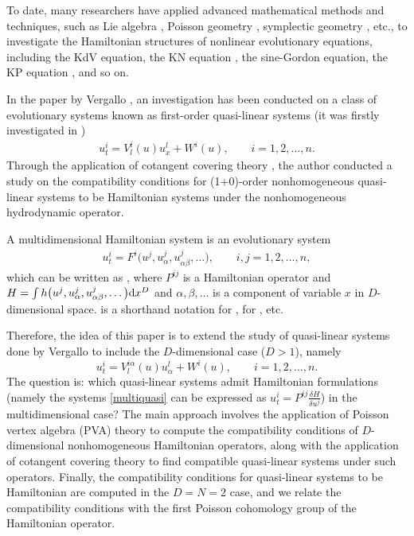 \documentclass[pdftex]{sigma}
\numberwithin{equation}{section}
\begin{document}
To date, many researchers have applied advanced mathematical methods and techniques, such as Lie algebra \cite{olver1993applications}, Poisson geometry \cite{weinstein1983local}, symplectic geometry \cite{mokhov1995symplectic}, etc., to investigate the Hamiltonian structures of nonlinear evolutionary equations, including the KdV equation, the KN equation \cite{mokhov1995symplectic}, the sine-Gordon equation, the KP equation \cite{dubrovin2001integrable,olver1980hamiltonian}, and so on.

In the paper by Vergallo \cite{vergallo2023non}, an investigation has been conducted on a class of evolutionary systems known as first-order quasi-linear systems (it was firstly investigated in \cite{Vergallo_2022})
\begin{gather*}
u^i_t=V^i_l(u)u^l_x+W^i(u), \qquad i=1,2,\dots, n.
\end{gather*}
Through the application of cotangent covering theory \cite{krasil1989nonlocal,vergallo2021homogeneous}, the author conducted a study on the compatibility conditions for (1+0)-order nonhomogeneous quasi-linear systems to be Hamiltonian systems under the nonhomogeneous hydrodynamic operator.

A multidimensional Hamiltonian system is an evolutionary system
\begin{gather*}
u^i_t=F^i\big(u^j,u^j_\alpha,u^j_{\alpha\beta},\dots\big), \qquad i,j=1,2,\dots,n,
\end{gather*}
which can be written as , where $P^{ij}$ is a Hamiltonian operator and $H=\int h\big(u^j,u^j_\alpha,\allowbreak \smash{u^j_{\alpha\beta},\dots\big) {\rm d}x^D}$ and $\alpha ,\beta ,\dots$ is a component of variable $x$ in $D$-dimensional space.  is a shorthand notation for ,  for , etc.

Therefore, the idea of this paper is to extend the study of quasi-linear systems done by Vergallo to include the $D$-dimensional case ($D>1$), namely
\begin{equation}\label{multiquasi}
u^i_t=V^{i\alpha}_l(u)u^l_\alpha+W^i(u), \qquad i=1,2,\dots, n.
\end{equation}
The question is: which quasi-linear systems admit Hamiltonian formulations (namely the systems \eqref{multiquasi} can be expressed as $u^i_t=P^{ij}\frac{\delta H}{\delta u^j}$) in the multidimensional case? The main approach involves the application of Poisson vertex algebra (PVA) theory to compute the compatibility conditions of $D$-dimensional nonhomogeneous Hamiltonian operators, along with the application of cotangent covering theory to find compatible quasi-linear systems under such operators. Finally, the compatibility conditions for quasi-linear systems to be Hamiltonian are computed in the $D=N=2$ case, and we relate the compatibility conditions with the first Poisson cohomology group of the Hamiltonian operator.
\end{document}
